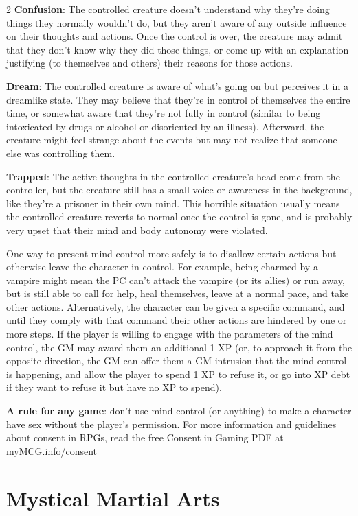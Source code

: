 \begin{multicols}{2}
\textbf{Confusion}: The controlled creature doesn’t understand why they’re doing things they normally wouldn’t do, but they aren’t aware of any outside influence on their thoughts and actions. Once the control is over, the creature may admit that they don’t know why they did those things, or come up with an explanation justifying (to themselves and others) their reasons for those actions. 

\textbf{Dream}: The controlled creature is aware of what’s going on but perceives it in a dreamlike state. They may believe that they’re in control of themselves the entire time, or somewhat aware that they’re not fully in control (similar to being intoxicated by drugs or alcohol or disoriented by an illness). Afterward, the creature might feel strange about the events but may not realize that someone else was controlling them. 

\textbf{Trapped}: The active thoughts in the controlled creature’s head come from the controller, but the creature still has a small voice or awareness in the background, like they’re a prisoner in their own mind. This horrible situation usually means the controlled creature reverts to normal once the control is gone, and is probably very upset that their mind and body autonomy were violated.

One way to present mind control more safely is to disallow certain actions but otherwise leave the character in control. For example, being charmed by a vampire might mean the PC can’t attack the vampire (or its allies) or run away, but is still able to call for help, heal themselves, leave at a normal pace, and take other actions. Alternatively, the character can be given a specific command, and until they comply with that command their other actions are hindered by one or more steps. If the player is willing to engage with the parameters of the mind control, the GM may award them an additional 1 XP (or, to approach it from the opposite direction, the GM can offer them a GM intrusion that the mind control is happening, and allow the player to spend 1 XP to refuse it, or go into XP debt if they want to refuse it but have no XP to spend).

\textbf{A rule for any game}: don’t use mind control (or anything) to make a character have sex without the player’s permission. For more information and guidelines about consent in RPGs, read the free Consent in Gaming PDF at myMCG.info/consent

\section{Mystical Martial Arts}


\end{multicols}
